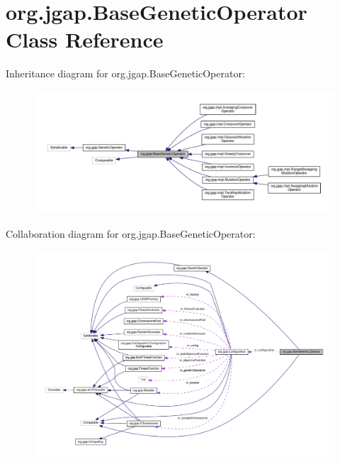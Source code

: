 \hypertarget{classorg_1_1jgap_1_1_base_genetic_operator}{\section{org.\-jgap.\-Base\-Genetic\-Operator Class Reference}
\label{classorg_1_1jgap_1_1_base_genetic_operator}
}


Inheritance diagram for org.\-jgap.\-Base\-Genetic\-Operator\-:
\nopagebreak
\begin{figure}[H]
\begin{center}
\leavevmode
\includegraphics[width=350pt]{classorg_1_1jgap_1_1_base_genetic_operator__inherit__graph}
\end{center}
\end{figure}


Collaboration diagram for org.\-jgap.\-Base\-Genetic\-Operator\-:
\nopagebreak
\begin{figure}[H]
\begin{center}
\leavevmode
\includegraphics[width=350pt]{classorg_1_1jgap_1_1_base_genetic_operator__coll__graph}
\end{center}
\end{figure}
